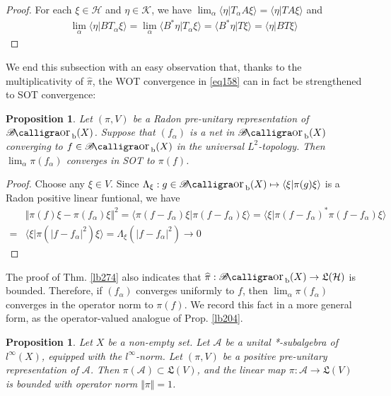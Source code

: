 \documentclass[12pt,b5paper,notitlepage]{article}
\theoremstyle{definition}
\theoremstyle{plain}
\newtheorem{pp}[df]{Proposition}
\DeclareMathOperator{\Borb}{{\mathscr{B}\text{\kern -2pt {\calligra\large or}}\,}_{\mathrm b}}
\newcommand{\fk}{\mathfrak}
\newcommand{\wht}{\widehat}
\newcommand{\bk}[1]{\langle {#1}\rangle}
\newcommand{\scr}{\mathscr}
\newcommand{\MH}{\mathcal H}
\newcommand{\MK}{\mathcal K}
\newcommand{\SA}{\mathscr A}
\numberwithin{equation}{section}
\begin{document}
\begin{proof}
For each $\xi\in\MH$ and $\eta\in\MK$, we have $\lim_\alpha\bk{\eta|T_\alpha A\xi}=\bk{\eta|TA\xi}$ and
\begin{align*}
\lim_\alpha\bk{\eta|BT_\alpha\xi}=\lim_\alpha\bk{B^*\eta|T_\alpha\xi}=\bk{B^*\eta|T\xi}=\bk{\eta|BT\xi}
\end{align*}
\end{proof}


We end this subsection with an easy observation that, thanks to the multiplicativity of $\wht\pi$, the WOT convergence in \eqref{eq158} can in fact be strengthened to SOT convergence:


\begin{pp}\label{lb293}
Let $(\pi,V)$ be a Radon pre-unitary representation of $\Borb(X)$. Suppose that $(f_\alpha)$ is a net in $\Borb(X)$ converging to $f\in\Borb(X)$ in the universal $L^2$-topology. Then $\lim_\alpha\pi(f_\alpha)$ converges in SOT to $\pi(f)$.
\end{pp}

\begin{proof}
Choose any $\xi\in V$. Since $\Lambda_\xi:g\in\Borb(X)\mapsto\bk{\xi|\pi(g)\xi}$ is a Radon positive linear funtional, we have
\begin{align*}
&\Vert \pi(f)\xi-\pi(f_\alpha)\xi\Vert^2=\bk{\pi(f-f_\alpha)\xi|\pi(f-f_\alpha)\xi}=\bk{\xi|\pi(f-f_\alpha)^*\pi(f-f_\alpha)\xi}\\
=&\bk{\xi|\pi(|f-f_\alpha|^2)\xi}=\Lambda_\xi(|f-f_\alpha|^2)\rightarrow0
\end{align*}
\end{proof}


The proof of Thm. \ref{lb274} also indicates that $\wht\pi:\Borb(X)\rightarrow\fk L(\MH)$ is bounded. Therefore, if $(f_\alpha)$ converges uniformly to $f$, then $\lim_\alpha\pi(f_\alpha)$ converges in the operator norm to $\pi(f)$. We record this fact in a more general form, as the operator-valued analogue of Prop. \ref{lb204}.

\begin{pp}\label{lb294}
Let $X$ be a non-empty set. Let $\scr A$ be a unital *-subalgebra of $l^\infty(X)$, equipped with the $l^\infty$-norm. Let $(\pi,V)$ be a positive pre-unitary representation of $\scr A$. Then $\pi(\SA)\subset\fk L(V)$, and the linear map $\pi:\SA\rightarrow\fk L(V)$ is bounded with operator norm $\Vert\pi\Vert=1$.
\end{pp}
\end{document}
